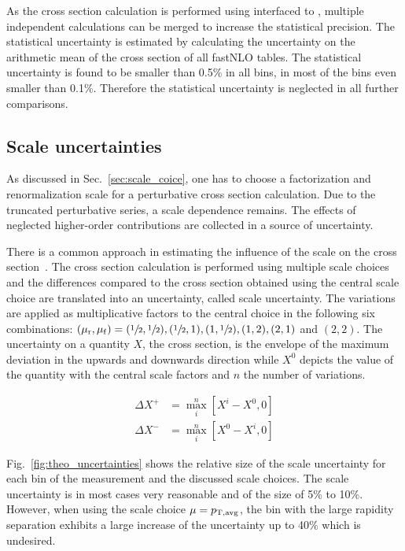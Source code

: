 As the cross section calculation is performed using \fastNLO interfaced to
\NLOJETPP, multiple independent calculations can be merged to increase the
statistical precision. The statistical uncertainty is estimated by calculating
the uncertainty on the arithmetic mean of the cross section of all fastNLO
tables.  The statistical uncertainty is found to be smaller than 0.5\% in all
bins, in most of the bins even smaller than 0.1\%. Therefore the statistical
uncertainty is neglected in all further comparisons.

\subsection{Scale uncertainties}
\label{sec:scale_uncertainties}

As discussed in Sec.~\ref{sec:scale_coice}, one has to choose a factorization
and renormalization scale for a perturbative cross section calculation. Due to
the truncated perturbative series, a scale dependence remains. The effects of
neglected higher-order contributions are collected in a source of uncertainty.

There is a common approach in estimating the influence of the scale on the cross
section~\cite{Banfi:2010xy}. The cross section calculation is performed using
multiple scale choices and the differences compared to the cross section
obtained using the central scale choice are translated into an uncertainty,
called scale uncertainty. The variations are applied as multiplicative factors
to the central choice in the following six combinations: $(\mu_{\mathrm{r}}, \mu_{\mathrm{f}}) =
(\sfrac{1}{2}, \sfrac{1}{2}), (\sfrac{1}{2}, 1), (1, \sfrac{1}{2}), (1, 2), (2,
1)$ and $(2, 2)$. The uncertainty on a quantity $X$, \eg the cross section, is
the envelope of the maximum deviation in the upwards and downwards direction
while $X^0$ depicts the value of the quantity with the central scale factors and
$n$ the number of variations.

\begin{align*}
    \Delta X^+ &= \max_{i}^{n} \left[ X^i - X^0, 0 \right]\\
    \Delta X^- &= \max_{i}^{n} \left[ X^0 - X^i, 0 \right]
\end{align*}


Fig.~\ref{fig:theo_uncertainties} shows the relative size of the scale
uncertainty for each bin of the measurement and the discussed scale choices. The
scale uncertainty is in most cases very reasonable and of the size of 5\% to
10\%. However, when using the scale choice $\mu=p_{\mathrm{T,avg}}$, the bin with the large
rapidity separation exhibits a large increase of the uncertainty up to 40\%
which is undesired.


